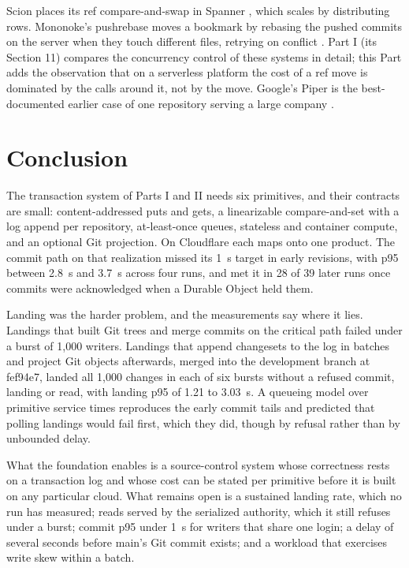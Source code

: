 \documentclass[11pt,letterpaper]{article}
\theoremstyle{definition}
\theoremstyle{remark}
\begin{document}
Scion places its ref compare-and-swap in Spanner \cite{anthropic2026scion,corbett2012spanner}, which scales by distributing rows. Mononoke's pushrebase moves a bookmark by rebasing the pushed commits on the server when they touch different files, retrying on conflict \cite{mononokepushrebase}. Part I (its Section 11) compares the concurrency control of these systems in detail; this Part adds the observation that on a serverless platform the cost of a ref move is dominated by the calls around it, not by the move. Google's Piper is the best-documented earlier case of one repository serving a large company \cite{potvin2016piper}.

\section{Conclusion}
\label{sec:sgoc:conclusion}

The transaction system of Parts I and II needs six primitives, and their contracts are small: content-addressed puts and gets, a linearizable compare-and-set with a log append per repository, at-least-once queues, stateless and container compute, and an optional Git projection. On Cloudflare each maps onto one product. The commit path on that realization missed its 1~s target in early revisions, with p95 between 2.8~s and 3.7~s across four runs, and met it in 28 of 39 later runs once commits were acknowledged when a Durable Object held them. %

Landing was the harder problem, and the measurements say where it lies. Landings that built Git trees and merge commits on the critical path failed under a burst of 1,000 writers. Landings that append changesets to the log in batches and project Git objects afterwards, merged into the development branch at fef94e7, landed all 1,000 changes in each of six bursts without a refused commit, landing or read, with landing p95 of 1.21 to 3.03~s. %
A queueing model over primitive service times reproduces the early commit tails and predicted that polling landings would fail first, which they did, though by refusal rather than by unbounded delay.

What the foundation enables is a source-control system whose correctness rests on a transaction log and whose cost can be stated per primitive before it is built on any particular cloud. What remains open is a sustained landing rate, which no run has measured; reads served by the serialized authority, which it still refuses under a burst; commit p95 under 1~s for writers that share one login; a delay of several seconds before main's Git commit exists; and a workload that exercises write skew within a batch. %
\end{document}
